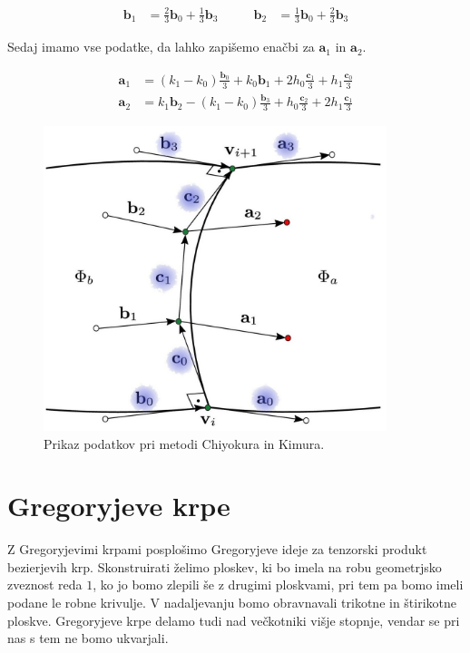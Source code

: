 \documentclass[a4paper,regno]{article}
\newcommand{\tbf}{\textbf}
\begin{document}
	\begin{equation*}
		\begin{split}
			\tbf{b}_1 &= \frac{2}{3}\tbf{b}_0 + \frac{1}{3}\tbf{b}_3
		\end{split}
		\quad\quad
		\begin{split}
			\tbf{b}_2 &= \frac{1}{3}\tbf{b}_0 + \frac{2}{3}\tbf{b}_3
		\end{split}
	\end{equation*}

	Sedaj imamo vse podatke, da lahko zapišemo enačbi za $\textbf{a}_1$ in $\textbf{a}_2$.

	\begin{align*}
		\tbf{a}_1 &= (k_1 - k_0)\frac{\tbf{b}_0}{3} + k_0\tbf{b}_1 + 2h_0\frac{\tbf{c}_1}{3} + h_1\frac{\tbf{c}_0}{3} \\
		\tbf{a}_2 &= k_1\tbf{b}_2 - (k_1 - k_0)\frac{\tbf{b}_3}{3} + h_0\frac{\tbf{c}_2}{3} + 2h_1\frac{\tbf{c}_1}{3}
	\end{align*}

	\begin{figure}[h]
		\centering
		\includegraphics[width=10cm]{metoda_CinK_pobarvano.jpg}
		\caption{Prikaz podatkov pri metodi Chiyokura in Kimura.}
		\label{fig:chi_ki_metoda}
	\end{figure}


\section{Gregoryjeve krpe}
Z Gregoryjevimi krpami posplošimo Gregoryjeve ideje za tenzorski produkt bezierjevih krp.
Skonstruirati želimo ploskev, ki bo imela na robu geometrjsko zveznost reda $1$, ko jo bomo zlepili še z drugimi ploskvami, pri tem pa bomo imeli podane le robne krivulje. V nadaljevanju bomo obravnavali trikotne in štirikotne ploskve. Gregoryjeve krpe delamo tudi nad večkotniki višje stopnje, vendar se pri nas s tem ne bomo ukvarjali.
\end{document}
